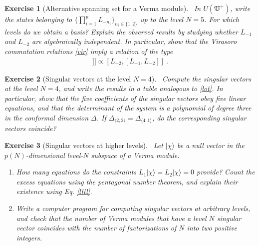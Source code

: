 \documentclass[12pt, a4paper, notitlepage, twoside]{report}
\numberwithin{equation}{section}
\theoremstyle{break}
\newtheorem{exo}{Exercise}[chapter]
\begin{document}
\begin{exo}[Alternative spanning set for a Verma module]
 ~\label{exoot}
In $U(\mathfrak{V}^+)$, write the states belonging to  $\{\prod_{i=1}^p L_{-n_i}\}_{n_i\in\{1,2\}}$ up to the level $N=5$.
For which levels do we obtain a basis? Explain the observed results by studying whether $L_{-1}$ and $L_{-2}$ are algebraically independent.
In particular, show that the Virasoro commutation relations \eqref{vir} imply a relation of the type
\begin{align}
 [L_{-1},[L_{-1},[L_{-1},L_{-2}]]] \propto [L_{-2},[L_{-1},L_{-2}]]\ .
 \label{llll}
\end{align}
\end{exo}

\begin{exo}[Singular vectors at the level $N=4$]
~\label{exolf}
 Compute the singular vectors at the level $N=4$, and write the results in a table analogous to \eqref{lot}.
In particular, show that the five coefficients of the singular vectors obey five linear equations, and that the determinant of the system is a polynomial of degree three in the conformal dimension $\Delta$. 
If $\Delta_{\langle 2,2 \rangle} = \Delta_{\langle 4, 1\rangle}$, do the corresponding singular vectors coincide?
\end{exo}

\begin{exo}[Singular vectors at higher levels]
~\label{exohl}
Let $|\chi\rangle$ be
a null vector in the $p(N)$-dimensional level-$N$ subspace of a Verma module.
\begin{enumerate}
 \item How many equations do the constraints $L_1|\chi\rangle = L_2|\chi\rangle = 0$ provide? Count the excess equations using the pentagonal number theorem, and explain their existence using Eq. \eqref{llll}.
 \item
 Write a computer program for computing singular vectors at arbitrary levels, and check that the number of Verma modules that have a level $N$ singular vector coincides with the number of factorizations of $N$ into two positive integers.
\end{enumerate}
\end{exo}
\end{document}

